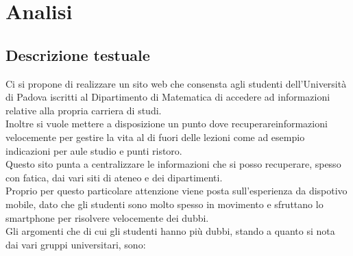 \section{Analisi}
\subsection{Descrizione testuale}

Ci si propone di realizzare un sito web che consensta agli studenti dell'Università di Padova iscritti al Dipartimento di Matematica di accedere ad informazioni relative alla propria carriera di studi.\\
Inoltre si vuole mettere a disposizione un punto dove recuperareinformazioni velocemente per gestire la vita al di fuori delle lezioni come ad esempio indicazioni per aule studio e punti ristoro.\\
Questo sito punta a centralizzare le informazioni che si posso recuperare, spesso con fatica, dai vari siti di ateneo e dei dipartimenti.\\
Proprio per questo particolare attenzione viene posta sull'esperienza da dispotivo mobile, dato che gli studenti sono molto spesso in movimento e sfruttano lo smartphone per risolvere velocemente dei dubbi.\\
Gli argomenti che di cui gli studenti hanno più dubbi, stando a quanto si nota dai vari gruppi universitari, sono:

